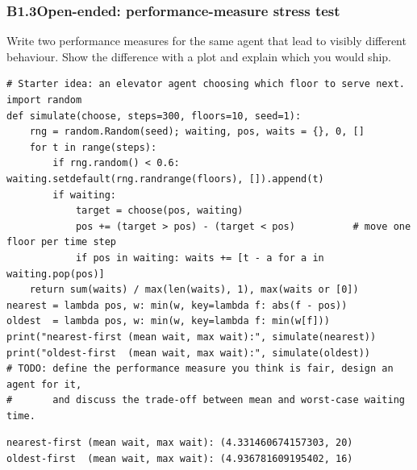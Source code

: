 \documentclass[11pt]{article}
\begin{document}
\subsubsection*{B1.3\quad Open-ended: performance-measure stress test}
Write two performance measures for the same agent that lead to visibly different behaviour. Show the difference with a plot and explain which you would ship.
\begin{lstlisting}[style=py]
# Starter idea: an elevator agent choosing which floor to serve next.
import random
def simulate(choose, steps=300, floors=10, seed=1):
    rng = random.Random(seed); waiting, pos, waits = {}, 0, []
    for t in range(steps):
        if rng.random() < 0.6: waiting.setdefault(rng.randrange(floors), []).append(t)
        if waiting:
            target = choose(pos, waiting)
            pos += (target > pos) - (target < pos)          # move one floor per time step
            if pos in waiting: waits += [t - a for a in waiting.pop(pos)]
    return sum(waits) / max(len(waits), 1), max(waits or [0])
nearest = lambda pos, w: min(w, key=lambda f: abs(f - pos))
oldest  = lambda pos, w: min(w, key=lambda f: min(w[f]))
print("nearest-first (mean wait, max wait):", simulate(nearest))
print("oldest-first  (mean wait, max wait):", simulate(oldest))
# TODO: define the performance measure you think is fair, design an agent for it,
#       and discuss the trade-off between mean and worst-case waiting time.
\end{lstlisting}
\begin{lstlisting}[style=out]
nearest-first (mean wait, max wait): (4.331460674157303, 20)
oldest-first  (mean wait, max wait): (4.936781609195402, 16)
\end{lstlisting}
\newpage
{}
\end{document}
